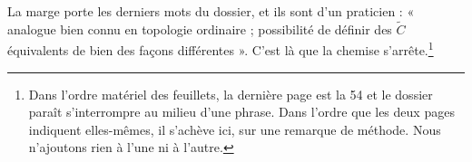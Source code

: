 \documentclass[11pt,a4paper]{article}
\begin{document}
La marge porte les derniers mots du dossier, et ils sont d'un praticien :
« analogue bien connu en topologie ordinaire ; possibilité de définir des
$\widetilde{C}$ équivalents de bien des façons différentes ». C'est là que la
chemise s'arrête.\footnote{Dans l'ordre matériel des feuillets, la dernière
page est la 54 et le dossier paraît s'interrompre au milieu d'une phrase. Dans
l'ordre que les deux pages indiquent elles-mêmes, il s'achève ici, sur une
remarque de méthode. Nous n'ajoutons rien à l'une ni à
l'autre.}
\end{document}
